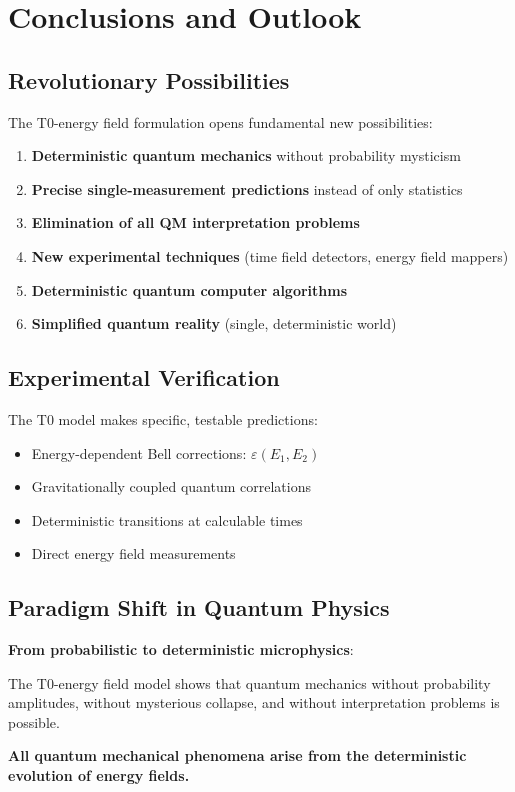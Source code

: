 \documentclass[12pt,a4paper]{article}
\begin{document}
	\section{Conclusions and Outlook}
	
	\subsection{Revolutionary Possibilities}
	
	The T0-energy field formulation opens fundamental new possibilities:
	
	\begin{enumerate}
		\item \textbf{Deterministic quantum mechanics} without probability mysticism
		\item \textbf{Precise single-measurement predictions} instead of only statistics
		\item \textbf{Elimination of all QM interpretation problems}
		\item \textbf{New experimental techniques} (time field detectors, energy field mappers)
		\item \textbf{Deterministic quantum computer algorithms}
		\item \textbf{Simplified quantum reality} (single, deterministic world)
	\end{enumerate}
	
	\subsection{Experimental Verification}
	
	The T0 model makes specific, testable predictions:
	
	\begin{itemize}
		\item Energy-dependent Bell corrections: $\varepsilon(E_1, E_2)$
		\item Gravitationally coupled quantum correlations
		\item Deterministic transitions at calculable times
		\item Direct energy field measurements
	\end{itemize}
	
	\subsection{Paradigm Shift in Quantum Physics}
	
	\begin{tcolorbox}[colback=red!5!white,colframe=red!75!black,title=Quantum Physics Revolution]
		\textbf{From probabilistic to deterministic microphysics}:
		
		The T0-energy field model shows that quantum mechanics without probability amplitudes, without mysterious collapse, and without interpretation problems is possible.
		
		\textbf{All quantum mechanical phenomena arise from the deterministic evolution of energy fields.}
	\end{tcolorbox}
	
\end{document}
